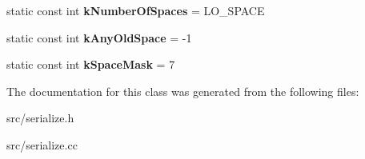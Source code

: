 \begin{DoxyCompactItemize}
\item 
\hypertarget{classv8_1_1internal_1_1_serializer_deserializer_a6daa032c293e99bdf9f7d66d8365f556}{}static const int {\bfseries k\+Number\+Of\+Spaces} = L\+O\+\_\+\+S\+P\+A\+C\+E\label{classv8_1_1internal_1_1_serializer_deserializer_a6daa032c293e99bdf9f7d66d8365f556}

\item 
\hypertarget{classv8_1_1internal_1_1_serializer_deserializer_af329fb1f13991ff5d8f843cdd52b0736}{}static const int {\bfseries k\+Any\+Old\+Space} = -\/1\label{classv8_1_1internal_1_1_serializer_deserializer_af329fb1f13991ff5d8f843cdd52b0736}

\item 
\hypertarget{classv8_1_1internal_1_1_serializer_deserializer_a1bf1b8de7b9b3f35cc0ca1828853f516}{}static const int {\bfseries k\+Space\+Mask} = 7\label{classv8_1_1internal_1_1_serializer_deserializer_a1bf1b8de7b9b3f35cc0ca1828853f516}

\end{DoxyCompactItemize}


The documentation for this class was generated from the following files\+:\begin{DoxyCompactItemize}
\item 
src/serialize.\+h\item 
src/serialize.\+cc\end{DoxyCompactItemize}
